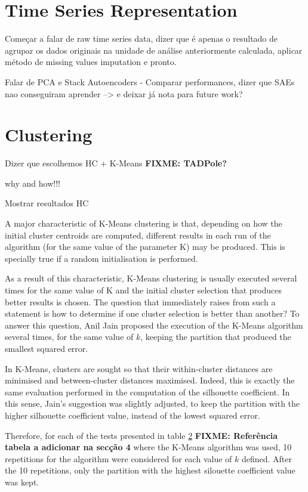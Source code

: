 \documentclass[9pt,journal,compsoc]{IEEEtran}
\begin{document}
\section{Time Series Representation}

Começar a falar de raw time series data, dizer que é apenas o resultado de agrupar os dados originais na unidade de análise anteriormente calculada, aplicar método de missing values imputation e pronto.

Falar de PCA e Stack Autoencoders - Comparar performances, dizer que SAEs nao conseguiram aprender --> e deixar já nota para future work?


\section{Clustering}

Dizer que escolhemos HC + K-Means \textbf{FIXME: TADPole?}

why and how!!!

Mostrar resultados HC

A major characteristic of K-Means clustering is that, depending on how the initial cluster centroids are computed, different results in each run of the algorithm (for the same value of the parameter K) may be produced. This is specially true if a random initialisation is performed.

As a result of this characteristic, K-Means clustering is usually executed several times for the same value of K and the initial cluster selection that produces better results is chosen. The question that immediately raises from such a statement is how to determine if one cluster selection is better than another? To answer this question, Anil Jain \cite{jain2009data} proposed the execution of the K-Means algorithm several times, for the same value of $k$, keeping the partition that produced the smallest squared error.

In K-Means, clusters are sought so that their within-cluster distances are minimised and between-cluster distances maximised. Indeed, this is exactly the same evaluation performed in the computation of the silhouette coefficient. In this sense, Jain's suggestion was slightly adjusted, to keep the partition with the higher silhouette coefficient value, instead of the lowest squared error.

Therefore, for each of the tests presented in table \ref{} \textbf{FIXME: Referência tabela a adicionar na secção 4} where the K-Means algorithm was used, 10 repetitions for the algorithm were considered for each value of $k$ defined. After the 10 repetitions, only the partition with the highest silouette coefficient value was kept.
\end{document}
